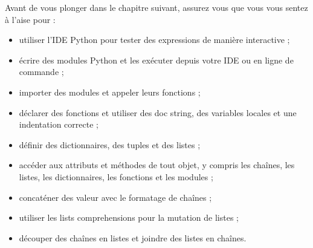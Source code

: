 Avant de vous plonger dans le chapitre suivant, assurez vous que vous vous
sentez à l'aise pour :
\begin{itemize}
\item{utiliser l'IDE Python pour tester des expressions de manière interactive ;}
\item{écrire des modules Python et les exécuter depuis votre IDE ou en ligne de commande ;}
\item{importer des modules et appeler leurs fonctions ;}
\item{déclarer des fonctions et utiliser des doc string, des variables locales et une indentation correcte ;}
\item{définir des dictionnaires, des tuples et des listes ;}
\item{accéder aux attributs et méthodes de tout objet, y compris les chaînes, les listes, les dictionnaires, les fonctions et les modules ;}
\item{concaténer des valeur avec le formatage de chaînes ;}
\item{utiliser les lists comprehensions pour la mutation de listes ;}
\item{découper des chaînes en listes et joindre des listes en chaînes.}
\end{itemize}
